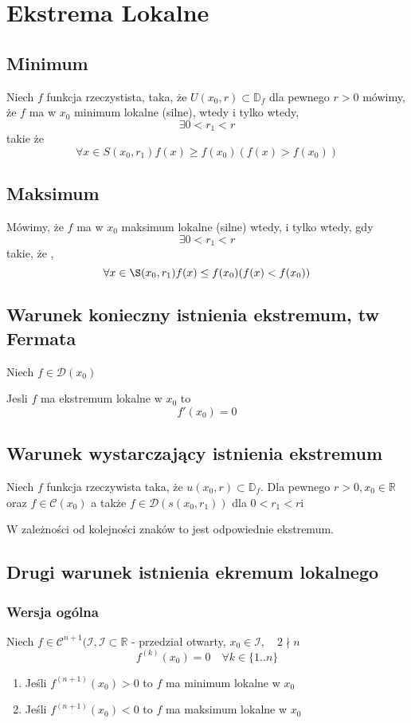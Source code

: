 \documentclass[11pt]{article}
\begin{document}
\section{Ekstrema Lokalne}
\subsection{Minimum}
Niech $f$ funkcja rzeczystista, taka, że $U(x_0,r) \subset \mathbb{D}_f$ dla pewnego $r >0$ mówimy, że $f$ ma w $x_0$ minimum lokalne (silne), wtedy i tylko wtedy, $$ \exists 0 < r_1 < r$$ takie że 
$$ \forall x \in S(x_0,r_1)  f(x) \geq f(x_0) (f(x) > f(x_0))$$
\subsection{Maksimum}
Mówimy, że $f$ ma w $x_0$ maksimum lokalne (silne) wtedy, i tylko wtedy, gdy $$ \exists 0 < r_1 < r$$ takie, że , $$ \forall x \in \S(x_0,r_1) f(x) \leq f(x_0) (f(x) < f(x_0)) $$

\subsection{Warunek konieczny istnienia ekstremum, tw Fermata}
Niech $f \in \mathcal{D}(x_0)$ 

Jesli $f$ ma ekstremum lokalne w $x_0$ to $$ f'(x_0) = 0$$

\subsection{Warunek wystarczający istnienia ekstremum}
Niech $f$ funkcja rzeczywista taka, że $ u(x_0,r) \subset \mathbb{D}_f$. Dla pewnego $r > 0, x_0 \in \mathbb{R}$ oraz $ f \in \mathcal{C}(x_0)$ a także $f \in \mathcal{D}(s(x_0,r_1))$ dla $0 < r_1 < r$i

W zależności od kolejności znaków to jest odpowiednie ekstremum. 

\subsection{Drugi warunek istnienia ekremum lokalnego}
\subsubsection{Wersja ogólna}
Niech $ f \in \mathcal{C}^{n+1}(\mathcal{I}, \mathcal{I} \subset \mathbb{R}$ - przedział otwarty, $x_0 \in \mathcal{I}, \quad 2 \nmid n $ 
$$ f^{(k)}(x_0) = 0 \quad \forall k \in \{1..n\}$$
\begin{enumerate}
\item{Jeśli $f^{(n+1)}(x_0) > 0$ to $f$ ma minimum lokalne w $x_0$}
\item{Jeśli $f^{(n+1)}(x_0) < 0$ to $f$ ma maksimum lokalne w $x_0$}
\end{enumerate}
\end{document}
